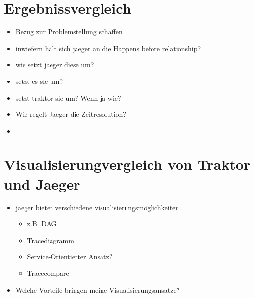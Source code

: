 \section{Ergebnissvergleich}
\label{section:Ergebnissvergleich}


\begin{itemize}
	\item Bezug zur Problemstellung schaffen
	\item inwiefern hält sich jaeger an die Happens before relationship?
	\item wie setzt jaeger diese um?
	\item setzt es sie um?
	\item setzt traktor sie um? Wenn ja wie?
	\item Wie regelt Jaeger die Zeitresolution?
	\item  
\end{itemize}
\section{Visualisierungvergleich von Traktor und Jaeger}
\label{section:Visualisierungvergleich von Traktor und Jaeger}
\begin{itemize}
	\item jaeger bietet verschiedene visualisierungsmöglichkeiten
	\begin{itemize}
		\item z.B. DAG
		\item Tracediagramm
		\item Service-Orientierter Ansatz?
		\item Tracecompare
	\end{itemize}
	\item Welche Vorteile bringen meine Visualisierungsansatze?
	
\end{itemize}
